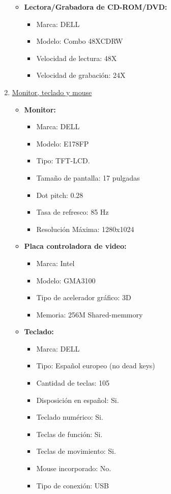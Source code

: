 \begin{enumerate}
\begin{itemize}
    \item \textbf{Lectora/Grabadora de CD-ROM/DVD:}
    \begin{itemize}
      \item Marca: DELL
      \item Modelo: Combo 48XCDRW
      \item Velocidad de lectura: 48X
      \item Velocidad de grabación: 24X
    \end{itemize}
  \end{itemize}
  
  \item \underline{Monitor, teclado y mouse}
  \begin{itemize}
    \item \textbf{Monitor:}
    \begin{itemize}
      \item Marca: DELL
      \item Modelo: E178FP
      \item Tipo: TFT-LCD.
      \item Tamaño de pantalla: 17 pulgadas
      \item Dot pitch: 0.28
      \item Tasa de refresco: 85 Hz
      \item Resolución Máxima: 1280x1024
    \end{itemize}
    
    \item \textbf{Placa controladora de video:}
    \begin{itemize}
      \item Marca: Intel
      \item Modelo: GMA3100
      \item Tipo de acelerador gráfico: 3D
      \item Memoria: 256M Shared-memmory
    \end{itemize}
    
    \item \textbf{Teclado:}
    \begin{itemize}
      \item Marca: DELL
      \item Tipo: Español europeo (no dead keys)
      \item Cantidad de teclas: 105
      \item Disposición en español: Si.
      \item Teclado numérico: Si.
      \item Teclas de función: Si.
      \item Teclas de movimiento: Si.
      \item Mouse incorporado: No.
      \item Tipo de conexión: USB
    \end{itemize}
    

\end{itemize}
\end{enumerate}
